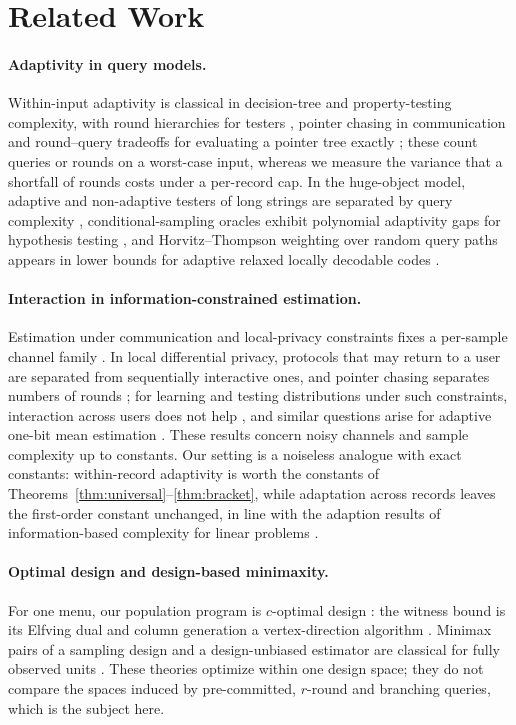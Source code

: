 \documentclass{article}
\begin{document}


\section{Related Work}\label{sec:related}
\paragraph{Adaptivity in query models.} Within-input adaptivity is classical in decision-tree and property-testing complexity, with round hierarchies for testers \citep{canonne2018}, pointer chasing in communication \citep{nisan1993} and round--query tradeoffs for evaluating a pointer tree exactly \citep{cook2012,li2026regex}; these count queries or rounds on a worst-case input, whereas we measure the variance that a shortfall of rounds costs under a per-record cap. In the huge-object model, adaptive and non-adaptive testers of long strings are separated by query complexity \citep{goldreich2022,chakraborty2023,adar2024}, conditional-sampling oracles exhibit polynomial adaptivity gaps for hypothesis testing \citep{xu2026}, and Horvitz--Thompson weighting over random query paths appears in lower bounds for adaptive relaxed locally decodable codes \citep{goldberg2026}.

\paragraph{Interaction in information-constrained estimation.} Estimation under communication and local-privacy constraints fixes a per-sample channel family \citep{acharya2019,barnes2020}. In local differential privacy, protocols that may return to a user are separated from sequentially interactive ones, and pointer chasing separates numbers of rounds \citep{joseph2019,joseph2020}; for learning and testing distributions under such constraints, interaction across users does not help \citep{acharya2022tit}, and similar questions arise for adaptive one-bit mean estimation \citep{lau2026}. These results concern noisy channels and sample complexity up to constants. Our setting is a noiseless analogue with exact constants: within-record adaptivity is worth the constants of Theorems~\ref{thm:universal}--\ref{thm:bracket}, while adaptation across records leaves the first-order constant unchanged, in line with the adaption results of information-based complexity for linear problems \citep{bakhvalov1971,novak1996}.

\paragraph{Optimal design and design-based minimaxity.} For one menu, our population program is $c$-optimal design \citep{elfving1952,pukelsheim1993}: the witness bound is its Elfving dual and column generation a vertex-direction algorithm \citep{fedorov1972,wynn1970,sagnol2011}. Minimax pairs of a sampling design and a design-unbiased estimator are classical for fully observed units \citep{stenger1979,gabler1990,aronow2026}. These theories optimize within one design space; they do not compare the spaces induced by pre-committed, $r$-round and branching queries, which is the subject here.
\end{document}
